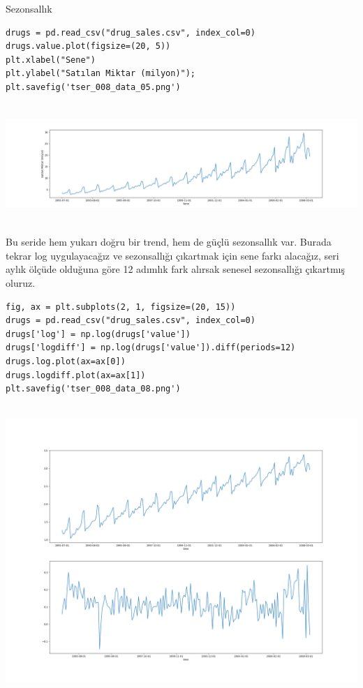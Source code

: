 \documentclass[12pt,fleqn]{article}\usepackage{../../common}
\begin{document}
Sezonsallık

\begin{verbatim}
drugs = pd.read_csv("drug_sales.csv", index_col=0)
drugs.value.plot(figsize=(20, 5))
plt.xlabel("Sene")
plt.ylabel("Satılan Miktar (milyon)");
plt.savefig('tser_008_data_05.png')
\end{verbatim}

\includegraphics[height=4.5cm]{tser_008_data_05.png}

Bu seride hem yukarı doğru bir trend, hem de güçlü sezonsallık var.  Burada
tekrar log uygulayacağız ve sezonsallığı çıkartmak için sene farkı alacağız,
seri aylık ölçüde olduğuna göre 12 adımlık fark alırsak senesel sezonsallığı
çıkartmış oluruz.


\begin{verbatim}
fig, ax = plt.subplots(2, 1, figsize=(20, 15))
drugs = pd.read_csv("drug_sales.csv", index_col=0)
drugs['log'] = np.log(drugs['value'])
drugs['logdiff'] = np.log(drugs['value']).diff(periods=12)
drugs.log.plot(ax=ax[0])
drugs.logdiff.plot(ax=ax[1])
plt.savefig('tser_008_data_08.png')
\end{verbatim}

\includegraphics[height=11cm]{tser_008_data_08.png}
\end{document}
